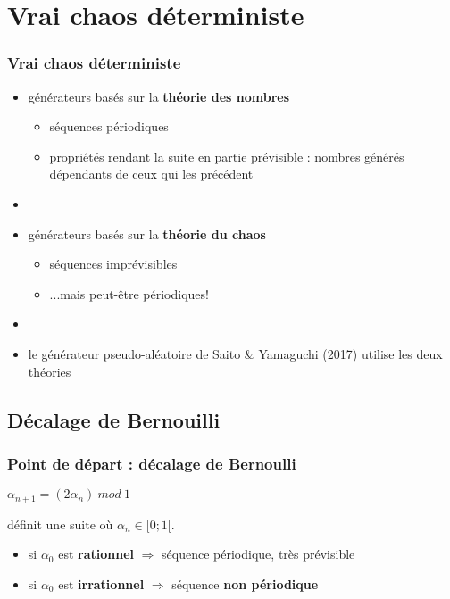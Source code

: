 \section{Vrai chaos déterministe}
\minitoc
\begin{frame}
  \frametitle{Vrai chaos déterministe}
  \begin{itemize}
  \item générateurs basés sur la \textbf{théorie des nombres}
  	\begin{itemize}
  		\item<2-> séquences périodiques
  		\item<3-> propriétés rendant la suite en partie prévisible : nombres générés dépendants de ceux qui les précédent 
	\end{itemize}
\item

\item<4->
  générateurs basés sur la \textbf{théorie du chaos}
  \begin{itemize}
  \item<5-> séquences imprévisibles
  \item<6-> ...mais peut-être périodiques!
\end{itemize}  
\item

\item<7-> le générateur pseudo-aléatoire de Saito \&
  Yamaguchi (2017) utilise les deux théories
	\end{itemize}   
\end{frame}
\subsection{Décalage de Bernouilli}
\begin{frame}
\frametitle{Point de départ : décalage de Bernoulli}
\begin{center}
{\LARGE $\alpha_{n+1}=(2\alpha_n)\ mod\ 1$\par}
\medskip
définit une suite où $\alpha_n \in [0;1[$.
\end{center}
\medskip
{}
\begin{itemize}
\item<3-> si $\alpha_0$ est \textbf{rationnel} $\Rightarrow$ séquence périodique, très prévisible \\
\item<4-> si $\alpha_0$ est \textbf{irrationnel} $\Rightarrow$ séquence  \textbf{non périodique}
\end{itemize}
\end{frame}

